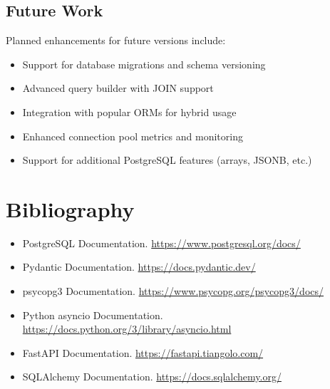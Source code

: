 \documentclass[12pt,a4paper]{report}
\begin{document}
\section{Future Work}

Planned enhancements for future versions include:

\begin{itemize}
	\item Support for database migrations and schema versioning
	\item Advanced query builder with JOIN support
	\item Integration with popular ORMs for hybrid usage
	\item Enhanced connection pool metrics and monitoring
	\item Support for additional PostgreSQL features (arrays, JSONB, etc.)
\end{itemize}

\chapter{Bibliography}

\begin{itemize}
	\item PostgreSQL Documentation. \url{https://www.postgresql.org/docs/}
	\item Pydantic Documentation. \url{https://docs.pydantic.dev/}
	\item psycopg3 Documentation. \url{https://www.psycopg.org/psycopg3/docs/}
	\item Python asyncio Documentation. \url{https://docs.python.org/3/library/asyncio.html}
	\item FastAPI Documentation. \url{https://fastapi.tiangolo.com/}
	\item SQLAlchemy Documentation. \url{https://docs.sqlalchemy.org/}
\end{itemize}
\end{document}
